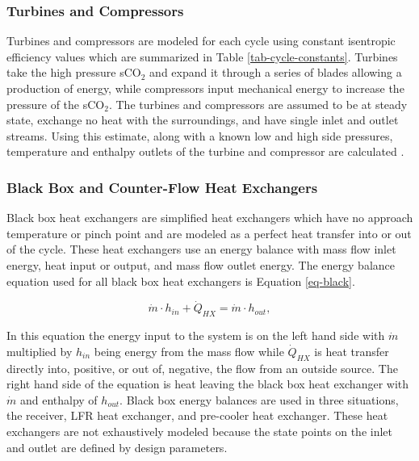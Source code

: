\subsubsection{Turbines and Compressors }

Turbines and compressors are modeled for each cycle using constant isentropic efficiency values which are summarized in Table \ref{tab-cycle-constants}. Turbines take the high pressure sCO$_2$ and expand it through a series of blades allowing a production of energy, while compressors input mechanical energy to increase the pressure of the sCO$_2$. The turbines and compressors are assumed to be at steady state, exchange no heat with the surroundings, and have single inlet and outlet streams. Using this estimate, along with a known low and high side pressures, temperature and enthalpy outlets of the turbine and compressor are calculated \cite{klein_nellis_2011}. 

\subsubsection{Black Box and Counter-Flow Heat Exchangers}

Black box heat exchangers are simplified heat exchangers which have no approach temperature or pinch point and are modeled as a perfect heat transfer into or out of the cycle. These heat exchangers use an energy balance with mass flow inlet energy, heat input or output, and mass flow outlet energy. The energy balance equation used for all black box heat exchangers is Equation \ref{eq-black}.


\begin{equation}
    \label{eq-black}
    \dot{m} \cdot h_{in} + \dot{Q}_{HX} = \dot{m} \cdot h_{out} ,
\end{equation}

In this equation the energy input to the system is on the left hand side with $\dot{m}$ multiplied by $h_{in}$ being energy from the mass flow while $\dot{Q}_{HX}$ is heat transfer directly into, positive, or out of, negative, the flow from an outside source. The right hand side of the equation is heat leaving the black box heat exchanger with $\dot{m}$ and enthalpy of $h_{out}$. Black box energy balances are used in three situations, the receiver, LFR heat exchanger, and pre-cooler heat exchanger. These heat exchangers are not exhaustively modeled because the state points on the inlet and outlet are defined by design parameters.


